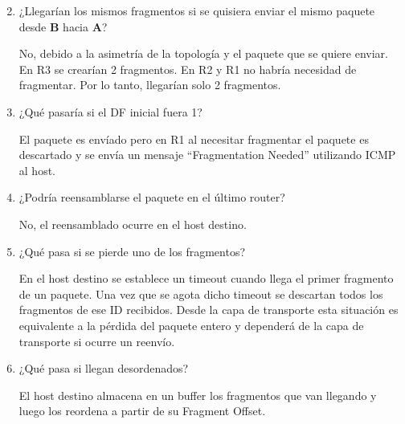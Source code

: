 \begin{enumerate}[left=0cm]
    \setcounter{enumi}{1}
    \renewcommand{\arraystretch}{1.5}
    \item ¿Llegarían los mismos fragmentos si se quisiera enviar el mismo paquete desde \textbf{B} hacia \textbf{A}?
    
    No, debido a la asimetría de la topología y el paquete que se quiere enviar. En R3 se crearían 2 fragmentos. En R2 y R1 no habría necesidad de fragmentar. Por lo tanto, llegarían solo 2 fragmentos.
        
    \item ¿Qué pasaría si el DF inicial fuera 1?
    
    El paquete es envíado pero en R1 al necesitar fragmentar el paquete es descartado y se envía un mensaje ``Fragmentation Needed'' utilizando ICMP al host.

    \item ¿Podría reensamblarse el paquete en el último router?

    No, el reensamblado ocurre en el host destino.

    \item ¿Qué pasa si se pierde uno de los fragmentos?

    En el host destino se establece un timeout cuando llega el primer fragmento de un paquete. Una vez que se agota dicho timeout se descartan todos los fragmentos de ese ID recibidos. Desde la capa de transporte esta situación es equivalente a la pérdida del paquete entero y dependerá de la capa de transporte si ocurre un reenvío.

    \item ¿Qué pasa si llegan desordenados?
    
    El host destino almacena en un buffer los fragmentos que van llegando y luego los reordena a partir de su Fragment Offset.
\end{enumerate}
